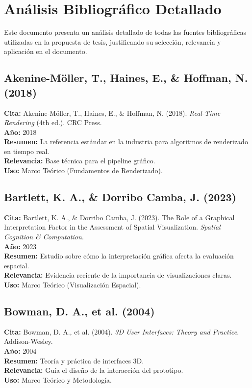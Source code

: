 \section*{Análisis Bibliográfico Detallado}

Este documento presenta un análisis detallado de todas las fuentes bibliográficas utilizadas en la propuesta de tesis, justificando su selección, relevancia y aplicación en el documento.

\subsection*{Akenine-Möller, T., Haines, E., \& Hoffman, N. (2018)}
\textbf{Cita:} Akenine-Möller, T., Haines, E., \& Hoffman, N. (2018). \textit{Real-Time Rendering} (4th ed.). CRC Press. \\
\textbf{Año:} 2018 \\
\textbf{Resumen:} La referencia estándar en la industria para algoritmos de renderizado en tiempo real. \\
\textbf{Relevancia:} Base técnica para el pipeline gráfico. \\
\textbf{Uso:} Marco Teórico (Fundamentos de Renderizado).

\subsection*{Bartlett, K. A., \& Dorribo Camba, J. (2023)}
\textbf{Cita:} Bartlett, K. A., \& Dorribo Camba, J. (2023). The Role of a Graphical Interpretation Factor in the Assessment of Spatial Visualization. \textit{Spatial Cognition \& Computation}. \\
\textbf{Año:} 2023 \\
\textbf{Resumen:} Estudio sobre cómo la interpretación gráfica afecta la evaluación espacial. \\
\textbf{Relevancia:} Evidencia reciente de la importancia de visualizaciones claras. \\
\textbf{Uso:} Marco Teórico (Visualización Espacial).

\subsection*{Bowman, D. A., et al. (2004)}
\textbf{Cita:} Bowman, D. A., et al. (2004). \textit{3D User Interfaces: Theory and Practice}. Addison-Wesley. \\
\textbf{Año:} 2004 \\
\textbf{Resumen:} Teoría y práctica de interfaces 3D. \\
\textbf{Relevancia:} Guía el diseño de la interacción del prototipo. \\
\textbf{Uso:} Marco Teórico y Metodología.

